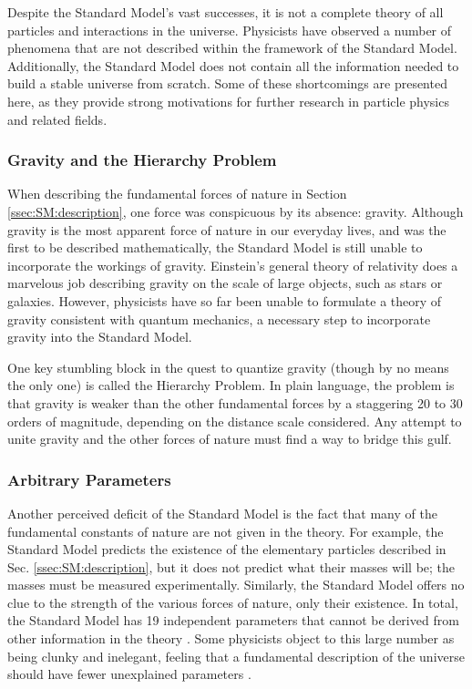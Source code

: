 Despite the Standard Model's vast successes, it is not a complete
theory of all particles and interactions in the universe. Physicists
have observed a number of phenomena that are not described within the
framework of the Standard Model. Additionally, the Standard Model does
not contain all the information needed to build a stable universe from
scratch. Some of these shortcomings are presented here, as they provide
strong motivations for further research in particle physics and
related fields.

\subsubsection*{Gravity and the Hierarchy Problem}
When describing the fundamental forces of nature in Section
\ref{ssec:SM:description}, one force was conspicuous by its absence:
gravity. Although gravity is the most apparent force of nature in our
everyday lives, and was the first to be described mathematically,
the Standard Model is still unable to incorporate the workings of
gravity. Einstein's general theory of relativity does a marvelous job
describing gravity on the scale of large objects, such as stars or
galaxies. However, physicists have so far been unable to formulate a
theory of gravity consistent with quantum mechanics, a necessary step
to incorporate gravity into the Standard Model.

One key stumbling block in the quest to quantize gravity (though by no
means the only one) is called the Hierarchy Problem. In plain language, the
problem is that gravity is weaker than the other fundamental forces by
a staggering 20 to 30 orders of magnitude, depending on the distance
scale considered. Any attempt to unite gravity and the other forces
of nature must find a way to bridge this gulf. %

\subsubsection*{Arbitrary Parameters}
Another perceived deficit of the Standard Model is the fact that many
of the fundamental constants of nature are not given in the theory. For
example, the Standard Model predicts the existence of the elementary
particles described in Sec. \ref{ssec:SM:description}, but it does
not predict what their masses will be;
the masses must be measured experimentally. Similarly, the Standard
Model offers no clue to the strength of the various forces of nature,
only their existence. In total, the Standard Model has 19 independent
parameters that cannot be derived from other information in the theory
\cite{smparams}. Some physicists object to this large number as being clunky
and inelegant, feeling that a fundamental description of the universe
should have fewer unexplained parameters \cite{griffiths}.

